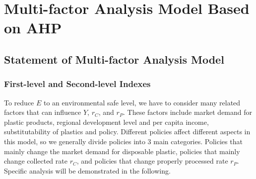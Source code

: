 \documentclass{mcmthesis}
\begin{document}


\section{Multi-factor Analysis Model Based on AHP}
 \subsection{Statement of Multi-factor Analysis Model}
	
  \subsubsection{First-level and Second-level Indexes}
    To reduce $E$ to an environmental safe level, we have to consider many related factors that can influence $Y$, $r_C$, and $r_P$. These factors include market demand for plastic products, regional development level and per capita income, substitutability of plastics and policy. Different policies affect different aspects in this model, so we generally divide policies into 3 main categories. Policies that mainly change the market demand for disposable plastic, policies that mainly change collected rate $r_C$, and policies that change properly processed rate $r_P$. Specific analysis will be demonstrated in the following. 
	
\end{document}
